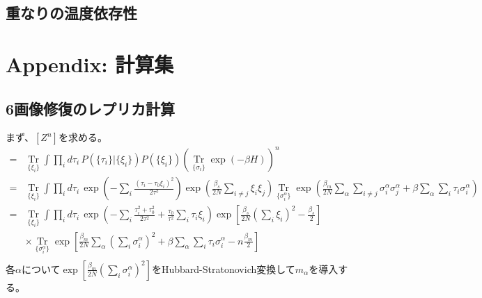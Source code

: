 \documentclass{ltjsarticle}
\begin{document}
\subsection{重なりの温度依存性}

\newpage
\section*{Appendix: 計算集}
\subsection*{6\quad 画像修復のレプリカ計算}
まず、$ [Z^n]$を求める。
\begin{align}
    [Z^n]
    =&\mathop{\mathrm{Tr}}\limits_{\{\xi_i\}}\int \prod_i d\tau_i\,P(\{\tau_i\}|\{\xi_i\})P(\{\xi_i\}) \left(\mathop{\mathrm{Tr}}\limits_{\{\sigma_i\}}\exp(-\beta H)\right)^n \\
    =&\mathop{\mathrm{Tr}}\limits_{\{\xi_i\}}\int \prod_i d\tau_i\,\exp\left(-\sum_i\frac{(\tau_i-\tau_0\xi_i)^2}{2\tau^2}\right)\exp\left(\frac{\beta_s}{2N}\sum_{i\neq j}\xi_i\xi_j\right) \mathop{\mathrm{Tr}}\limits_{\{\sigma_i^\alpha\}}\exp\left(\frac{\beta_m}{2 N}\displaystyle\sum_\alpha\sum_{i\neq j}\sigma_i^\alpha \sigma_j^\alpha + \beta\displaystyle\sum_\alpha\sum_i \tau_i\sigma_i^\alpha\right)\\
        =&\mathop{\mathrm{Tr}}\limits_{\{\xi_i\}}\int \prod_i d\tau_i\,\exp\left(-\sum_i\frac{\tau_i^2+\tau_0^2}{2\tau^2}+\frac{\tau_0}{\tau^2}\sum_i\tau_i\xi_i\right)\exp\left[\frac{\beta_s}{2N}\left(\sum_i \xi_i\right)^2-\frac{\beta_s}{2}\right]\\
    &\times\mathop{\mathrm{Tr}}\limits_{\{\sigma_i^\alpha\}}\exp\left[\frac{\beta_m}{2 N}\displaystyle\sum_\alpha\left(\sum_{i}\sigma_i^\alpha\right)^2 + \beta\displaystyle\sum_\alpha\sum_i \tau_i\sigma_i^\alpha-n\frac{\beta_m}{2}\right]\\
\end{align}
各$\alpha$について$\exp \left[\frac{\beta_m}{2N}\left(\displaystyle\sum_{i}\sigma_i^\alpha\right)^2\right] $をHubbard-Stratonovich変換して$m_\alpha$を導入する。
\end{document}
